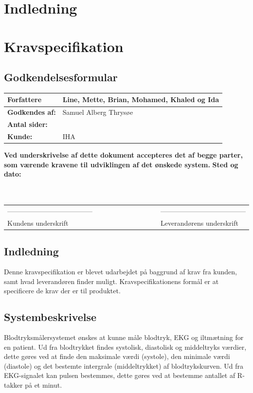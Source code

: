 \chapter{Indledning}

\chapter{Kravspecifikation}
\section{Godkendelsesformular}
\begin{table}[h!]
\label{tab:tabel2}
\begin{tabular}{| l | >{\raggedright\arraybackslash}p{12cm} |}
   \hline
   \textbf{Forfattere} & Line, Mette, Brian, Mohamed, Khaled og Ida\\ \hline
   \textbf{Godkendes af:} & Samuel Alberg Thrysøe\\ \hline
   \textbf{Antal sider:} & \\ \hline
   \textbf{Kunde:} & IHA\\ \hline
\end{tabular}
\end{table}
\textbf{Ved underskrivelse af dette dokument accepteres det af begge parter, som værende kravene til udviklingen af det ønskede system.}
\newline
\textbf{Sted og dato:}\\
\\
\\
\begin{table}
[h!]
\begin{tabular}{ l lllllllll l}
--------------------------------------&&&&&&&&&&--------------------------------------\\ 
Kundens underskrift &&&&&&&&&&Leverandørens underskrift\\
\end{tabular}
\end{table}
\section{Indledning}
Denne kravspecifikation er blevet udarbejdet på baggrund af krav fra kunden, samt hvad leverandøren finder muligt. Kravspecifikationens formål er at specificere de krav der er til produktet.
\newpage

\section{Systembeskrivelse}
Blodtryksmålersystemet ønskes at kunne måle blodtryk, EKG og iltmætning for en patient. Ud fra blodtrykket findes systolisk, diastolisk og middeltryks værdier, dette gøres ved at finde den maksimale værdi (systole), den minimale værdi (diastole) og det bestemte intergrale (middeltrykket) af blodtrykskurven. Ud fra EKG-signalet kan pulsen bestemmes, dette gøres ved at bestemme antallet af R-takker på et minut. 
\newpage

